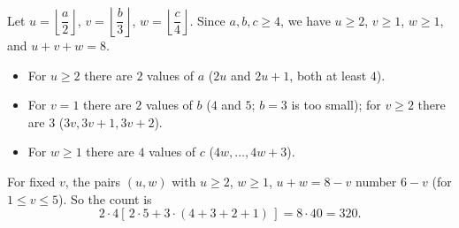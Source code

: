 Let $u=\left\lfloor \dfrac {a}{2}\right\rfloor$, $v=\left\lfloor \dfrac {b}{3}\right\rfloor$, $w=\left\lfloor \dfrac {c}{4}\right\rfloor$. Since $a,b,c\ge4$, we have $u\ge2$, $v\ge1$, $w\ge1$, and $u+v+w=8$.
\begin{itemize}
\item For $u\ge2$ there are $2$ values of $a$ ($2u$ and $2u+1$, both at least $4$).
\item For $v=1$ there are $2$ values of $b$ ($4$ and $5$; $b=3$ is too small); for $v\ge2$ there are $3$ ($3v,3v+1,3v+2$).
\item For $w\ge1$ there are $4$ values of $c$ ($4w,\dots,4w+3$).
\end{itemize}
For fixed $v$, the pairs $(u,w)$ with $u\ge2$, $w\ge1$, $u+w=8-v$ number $6-v$ (for $1\le v\le5$). So the count is
\[
2\cdot4\left[\,2\cdot5+3\cdot(4+3+2+1)\,\right]=8\cdot40=\boxed{320}.
\]
